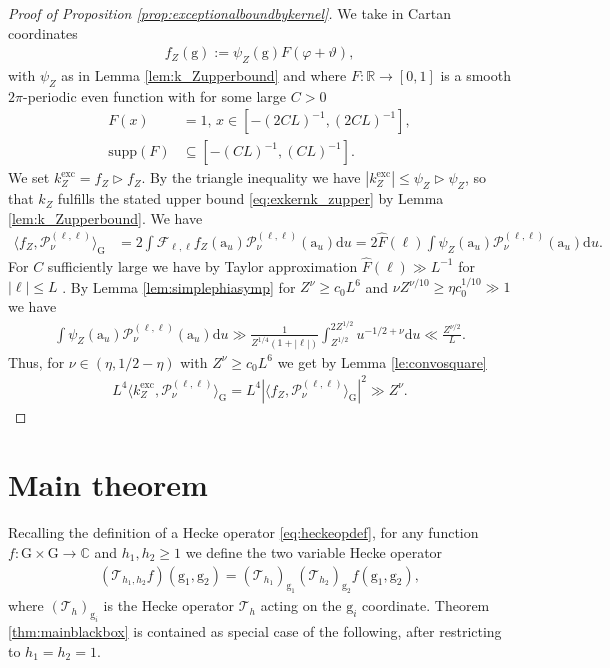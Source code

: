 \documentclass[12pt]{amsart}
\theoremstyle{definition}
\theoremstyle{remark}
\numberwithin{equation}{section}
\newcommand{\G}{\mathrm{G}}
\newcommand{\PP}{\mathcal{P}}
\newcommand{\C}{{\mathbb C}}
\newcommand{\R}{{\mathbb R}}
\newcommand{\1}{{\mathbf 1}}
\renewcommand{\a}{\mathrm{a}}
\newcommand{\g}{\mathrm{g}}
\renewcommand{\d}{\mathrm d}
\begin{document}
\begin{proof}[Proof of Proposition \ref{prop:exceptionalboundbykernel}]
We take in Cartan coordinates
\begin{align*}
    f_Z(\g) :=  \psi_Z(\g) F(\varphi + \vartheta),
\end{align*}
with $\psi_Z$ as in Lemma \ref{lem:k_Zupperbound} and where $F:\R \to [0,1]$ is a smooth $2\pi$-periodic even function with for some large $C>0$
\begin{align*}
       F(x)&=1, \, x \in  [-(2CL)^{-1},(2CL)^{-1}], \\
       \mathrm{supp}(F) &\subseteq [-(CL)^{-1},(CL)^{-1}].
\end{align*}
We set $k^{\mathrm{exc}}_Z = f_Z \rhd f_Z$. By the triangle inequality we have $|k^{\mathrm{exc}}_Z| \leq \psi_Z \rhd \psi_Z$, so that $k_Z$ fulfills the stated upper bound \eqref{eq:exkernk_zupper} by Lemma \ref{lem:k_Zupperbound}. We have
\begin{align*}
    \langle f_Z, \PP_\nu^{(\ell,\ell)} \rangle_\G  &= 2\int \mathcal{F}_{\ell,\ell} f_Z(\a_u) \PP_\nu^{(\ell,\ell)}(\a_u) \d u = 2\hat{F}(\ell) \int \psi_Z(\a_u) \PP_\nu^{(\ell,\ell)}(\a_u) \d u.
\end{align*}
For $C$ sufficiently large we have by Taylor approximation $\hat{F}(\ell) \gg L^{-1}$ for $|\ell| \leq L$ . By Lemma \ref{lem:simplephiasymp} for $Z^\nu \geq c_0 L^6$ and $\nu Z^{\nu/10} \geq  \eta c_0^{1/10} \gg 1$ we have
    \begin{align*}
         \int \psi_Z(\a_u) \PP_\nu^{(\ell,\ell)}(\a_u) \d u \gg \frac{1}{Z^{1/4} (1+|\ell|)} \int_{Z^{1/2}}^{2Z^{1/2}} u^{-1/2+\nu} \d u \ll \frac{Z^{\nu/2}}{L}.
    \end{align*}
Thus, for $\nu \in (\eta,1/2-\eta)$ with  $ Z^\nu \geq c_0 L^6$ we get by Lemma \ref{le:convosquare}
     \begin{align*}
       L^4 \langle k^{\mathrm{exc}}_Z, \PP_\nu^{(\ell,\ell)} \rangle_\G =  L^4 |\langle f_Z, \PP_\nu^{(\ell,\ell)} \rangle_\G |^2 \gg Z^\nu.
   \end{align*}
\end{proof}


\section{Main  theorem}
Recalling the definition of a Hecke operator \eqref{eq:heckeopdef}, for any function $f:\G\times \G\to \C$ and $h_1,h_2 \geq 1$ we define the two variable Hecke operator
\begin{align*}
    (\mathcal{T}_{h_1,h_2} f)(\g_1,\g_2)= (\mathcal{T}_{h_1})_{\g_1}(\mathcal{T}_{h_2})_{\g_2} f(\g_1,\g_2),
\end{align*}
where $(\mathcal{T}_{h})_{\g_i}$ is the Hecke operator $\mathcal{T}_{h}$ acting on the $\g_i$ coordinate. Theorem \ref{thm:mainblackbox} is contained as special case of the following, after restricting to $h_1=h_2=1$.
\end{document}
